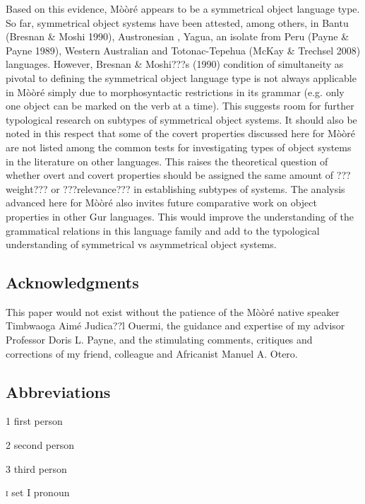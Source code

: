 \documentclass[output=paper]{langsci/langscibook}
\begin{document}
Based on this evidence, Mòòré appears to be a symmetrical object language type. So far, symmetrical object systems have been attested, among others, in Bantu (Bresnan \& Moshi 1990), Austronesian \citep{Donohue1996}, Yagua, an isolate from Peru (Payne \& Payne 1989), Western Australian \citep{Dench1995} and Totonac-Tepehua (McKay \& Trechsel 2008) languages. However, Bresnan \& Moshi???s (1990)  condition of simultaneity as pivotal to defining the symmetrical object language type is not always applicable in Mòòré simply due to morphosyntactic restrictions in its grammar (e.g. only one object can be marked on the verb at a time). This suggests room for further typological research on subtypes of symmetrical object systems. It should also be noted in this respect that some of the covert properties discussed here for Mòòré are not listed among the common tests for investigating types of object systems in the literature on other languages. This raises the theoretical question of whether overt and covert properties should be assigned the same amount of ???weight??? or ???relevance??? in establishing subtypes of systems. The analysis advanced here for Mòòré also invites future comparative work on object properties in other Gur languages. This would improve the understanding of the grammatical relations in this language family and add to the typological understanding of symmetrical vs asymmetrical object systems.

\subsection{Acknowledgments}

This paper would not exist without the patience of the Mòòré native speaker Timbwaoga Aimé Judica??l Ouermi, the guidance and expertise of my advisor Professor Doris L. Payne, and the stimulating comments, critiques and corrections of my friend, colleague and Africanist Manuel A. Otero. 

\subsection{Abbreviations}

1  first person



2  second person



3  third person



\textsc{i  }set I pronoun
\end{document}
